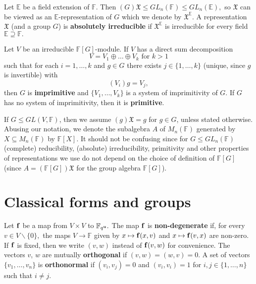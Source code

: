 Let  $\mathbb{E}$ be a field extension of $\mathbb{F}$. Then  $(G)\mathfrak{X} \le GL_n(\mathbb{F}) \le GL_n(\mathbb{E}),$ so $\mathfrak{X}$ can be viewed as an $\mathbb{E}$-representation of $G$ which we denote by $\mathfrak{X}^\mathbb{E}.$ A representation $\mathfrak{X}$ (and a group $G$) is {\bf absolutely irreducible} if $\mathfrak{X}^\mathbb{E}$ is irreducible for every field $\mathbb{E} \supseteq \mathbb{F}.$



Let $V$ be an irreducible $\mathbb{F}[G]$-module. If $V$ has a direct sum decomposition 
\begin{equation}\label{imprdecomp}
V=V_1 \oplus \ldots \oplus V_k \text{ for } k>1
\end{equation}
such that for each $i=1, \ldots, k$ and $g \in G$ there exists $j \in \{1, \ldots, k\}$ (unique, since $g$ is invertible) with 
$$(V_i)g=V_j,$$
then $G$ is {\bf imprimitive} and $\{V_1, \ldots, V_k\}$ is a system of imprimitivity of $G$. If $G$ has no system of imprimitivity, then it is {\bf primitive}. 

If $G \le GL(V,\mathbb{F})$, then we assume $(g)\mathfrak{X}=g$ for $g \in G$, unless stated otherwise. Abusing our notation, we denote the subalgebra $A$ of $M_n(\mathbb{F})$ generated by $X \subseteq M_n(\mathbb{F})$ by $\mathbb{F}[X].$ It should not be confusing since for $G \le GL_n(\mathbb{F})$ (complete) reducibility, (absolute) irreducibility, primitivity and other properties of representations we use do not depend on the choice of definition of $\mathbb{F}[G]$  (since $A=(\mathbb{F}[G])\mathfrak{X}$ for the group algebra  $\mathbb{F}[G]$).

\section{Classical forms and groups}
\label{clsec}

Let ${\bf f}$ be a map from $V \times V$ to $\mathbb{F}_{q^{\bf u}}.$ The map ${\bf f}$ is {\bf non-degenerate}  if, for every $v \in V \backslash \{0\},$ the  maps $V \to \mathbb{F}$ given by $x \mapsto {\bf f}(x,v)$ and $x \mapsto {\bf f}(v,x)$ are non-zero. If ${\bf f}$ is fixed, then we write $(v,w)$ instead of ${\bf f}(v,w)$ for convenience. The vectors $v$, $w$ are mutually {\bf orthogonal} if $(v,w)=(w,v)=0$. A set of vectors $\{v_1, \ldots, v_n\}$ is {\bf orthonormal} if $(v_i,v_j)=0$  and $(v_i,v_i)=1$ for $i,j \in \{1, \ldots, n\}$ such that  $i\ne j$. 

